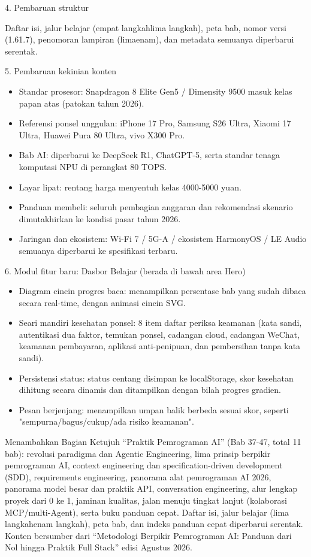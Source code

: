4. Pembaruan struktur

Daftar isi, jalur belajar (empat langkahlima langkah), peta bab, nomor versi (1.61.7), penomoran lampiran (limaenam), dan metadata semuanya diperbarui serentak.

5. Pembaruan kekinian konten

\begin{itemize}
  \item Standar prosesor: Snapdragon 8 Elite Gen5 / Dimensity 9500 masuk kelas papan atas (patokan tahun 2026).
  \item Referensi ponsel unggulan: iPhone 17 Pro, Samsung S26 Ultra, Xiaomi 17 Ultra, Huawei Pura 80 Ultra, vivo X300 Pro.
  \item Bab AI: diperbarui ke DeepSeek R1, ChatGPT-5, serta standar tenaga komputasi NPU di perangkat 80 TOPS.
  \item Layar lipat: rentang harga menyentuh kelas 4000-5000 yuan.
  \item Panduan membeli: seluruh pembagian anggaran dan rekomendasi skenario dimutakhirkan ke kondisi pasar tahun 2026.
  \item Jaringan dan ekosistem: Wi-Fi 7 / 5G-A / ekosistem HarmonyOS / LE Audio semuanya diperbarui ke spesifikasi terbaru.
\end{itemize}

6. Modul fitur baru: Dasbor Belajar (berada di bawah area Hero)

\begin{itemize}
  \item Diagram cincin progres baca: menampilkan persentase bab yang sudah dibaca secara real-time, dengan animasi cincin SVG.
  \item Seari mandiri kesehatan ponsel: 8 item daftar periksa keamanan (kata sandi, autentikasi dua faktor, temukan ponsel, cadangan cloud, cadangan WeChat, keamanan pembayaran, aplikasi anti-penipuan, dan pembersihan tanpa kata sandi).
  \item Persistensi status: status centang disimpan ke localStorage, skor kesehatan dihitung secara dinamis dan ditampilkan dengan bilah progres gradien.
  \item Pesan berjenjang: menampilkan umpan balik berbeda sesuai skor, seperti "sempurna/bagus/cukup/ada risiko keamanan".
\end{itemize}


Menambahkan Bagian Ketujuh “Praktik Pemrograman AI” (Bab 37-47, total 11 bab): revolusi paradigma dan Agentic Engineering, lima prinsip berpikir pemrograman AI, context engineering dan specification-driven development (SDD), requirements engineering, panorama alat pemrograman AI 2026, panorama model besar dan praktik API, conversation engineering, alur lengkap proyek dari 0 ke 1, jaminan kualitas, jalan menuju tingkat lanjut (kolaborasi MCP/multi-Agent), serta buku panduan cepat. Daftar isi, jalur belajar (lima langkahenam langkah), peta bab, dan indeks panduan cepat diperbarui serentak. Konten bersumber dari “Metodologi Berpikir Pemrograman AI: Panduan dari Nol hingga Praktik Full Stack” edisi Agustus 2026.

